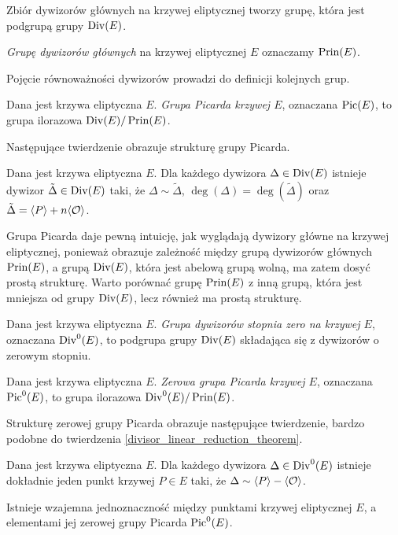 \begin{corollary}
Zbiór dywizorów głównych na krzywej eliptycznej tworzy grupę,
która jest podgrupą grupy $\operatorname{Div}(E)$.
\end{corollary}

\begin{definition}
\emph{Grupę dywizorów głównych} na krzywej eliptycznej $E$
oznaczamy $\operatorname{Prin}(E)$.
\end{definition}

Pojęcie równoważności dywizorów prowadzi do definicji kolejnych grup.

\begin{definition}
Dana jest krzywa eliptyczna $E$.
\emph{Grupa Picarda krzywej $E$},
oznaczana $\operatorname{Pic}(E)$,
to grupa ilorazowa $\operatorname{Div}(E)/\operatorname{Prin}(E)$.
\end{definition}

Następujące twierdzenie obrazuje strukturę grupy Picarda.

\begin{theorem}\label{divisor_linear_reduction_theorem}
Dana jest krzywa eliptyczna $E$.
Dla każdego dywizora $\Delta \in \operatorname{Div}(E)$
istnieje dywizor $\tilde{\Delta} \in \operatorname{Div}(E)$ taki,
że $\Delta \sim \tilde{\Delta}$, $\deg(\Delta) = \deg(\tilde{\Delta})$
oraz $\tilde{\Delta} = \langle P\rangle + n\langle\mathcal{O}\rangle$.
\end{theorem}

Grupa Picarda daje pewną intuicję,
jak wyglądają dywizory główne na krzywej eliptycznej,
ponieważ obrazuje zależność między grupą dywizorów głównych $\operatorname{Prin}(E)$,
a grupą $\operatorname{Div}(E)$, która jest abelową grupą wolną,
ma zatem dosyć prostą strukturę.
Warto porównać grupę $\operatorname{Prin}(E)$ z inną grupą,
która jest mniejsza od grupy $\operatorname{Div}(E)$,
lecz również ma prostą strukturę.

\begin{definition}
Dana jest krzywa eliptyczna $E$.
\emph{Grupa dywizorów stopnia zero na krzywej $E$},
oznaczana $\operatorname{Div}^0(E)$,
to podgrupa grupy $\operatorname{Div}(E)$ składająca się
z dywizorów o zerowym stopniu.
\end{definition}

\begin{definition}
Dana jest krzywa eliptyczna $E$.
\emph{Zerowa grupa Picarda krzywej $E$},
oznaczana $\operatorname{Pic}^0(E)$,
to grupa ilorazowa $\operatorname{Div}^0(E)/\operatorname{Prin}(E)$.
\end{definition}

Strukturę zerowej grupy Picarda obrazuje następujące twierdzenie,
bardzo podobne do twierdzenia \ref{divisor_linear_reduction_theorem}.

\begin{theorem}\label{zerodeg_divisor_linear_reduction_theorem}
Dana jest krzywa eliptyczna $E$.
Dla każdego dywizora $\Delta \in \operatorname{Div}^0(E)$
istnieje dokładnie jeden punkt krzywej $P \in E$ taki,
że $\Delta \sim \langle P\rangle - \langle\mathcal{O}\rangle$.
\end{theorem}

\begin{corollary}\label{piczero_curvepts_bijection_corollary}
Istnieje wzajemna jednoznaczność między punktami krzywej eliptycznej $E$,
a elementami jej zerowej grupy Picarda $\operatorname{Pic}^0(E)$.
\end{corollary}
